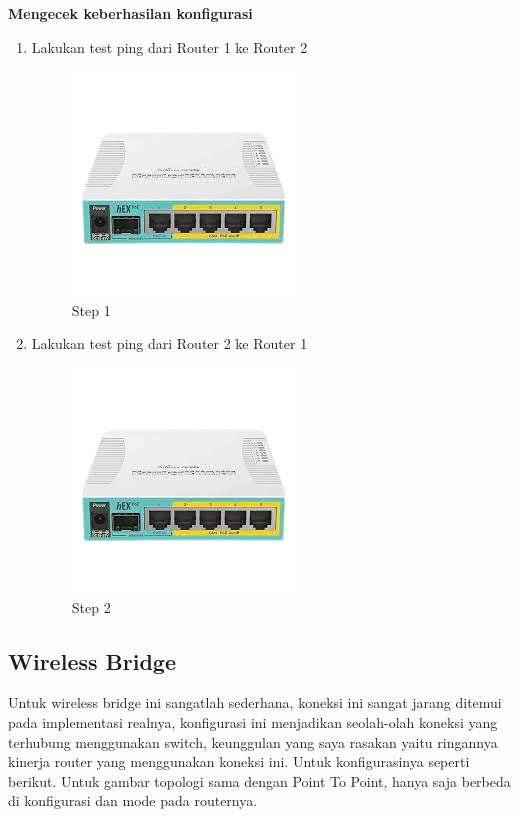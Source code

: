 \begin{center} 
	\textbf{Mengecek keberhasilan konfigurasi}
\end{center}

\begin{enumerate}
	\item Lakukan test ping dari Router 1 ke Router 2
	\begin{figure}[H]
		\centering
		\includegraphics[width=0.5\linewidth]{P1/img/contoh.png}
		\caption{Step 1}
		\label{fig:gambar14}
	\end{figure}

	\item Lakukan test ping dari Router 2 ke Router 1
	\begin{figure}[H]
		\centering
		\includegraphics[width=0.5\linewidth]{P1/img/contoh.png}
		\caption{Step 2}
		\label{fig:gambar15}
	\end{figure}

\end{enumerate}

\subsection{Wireless Bridge}
Untuk wireless bridge ini sangatlah sederhana, koneksi ini sangat jarang ditemui pada implementasi realnya, konfigurasi ini menjadikan seolah-olah koneksi yang terhubung menggunakan switch,
keunggulan yang saya rasakan yaitu ringannya kinerja router yang menggunakan koneksi ini. Untuk konfigurasinya seperti berikut. Untuk gambar topologi sama dengan Point To Point, hanya saja
berbeda di konfigurasi dan mode pada routernya.

